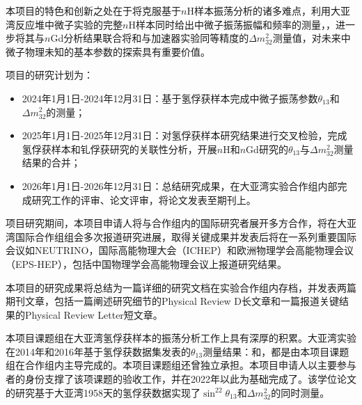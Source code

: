 \documentclass[a4paper,zihao=-4]{article}
\begin{document}

本项目的特色和创新之处在于将克服基于$n$H样本振荡分析的诸多难点，利用大亚湾反应堆中微子实验的完整$n$H样本同时给出中微子振荡振幅和频率的测量，，进一步将其与$n$Gd分析结果联合将和与加速器实验同等精度的$\Delta m_{32}^2$测量值，对未来中微子物理未知的基本参数的探索具有重要价值。


项目的研究计划为：
\begin{itemize}
	\item 2024年1月1日-2024年12月31日：基于氢俘获样本完成中微子振荡参数$\theta_{13}$和$\Delta m_{32}^2$的测量；
	\item 2025年1月1日-2025年12月31日：对氢俘获样本研究结果进行交叉检验，完成氢俘获样本和钆俘获研究的关联性分析，开展$n$H和$n$Gd研究的$\theta_{13}$与$\Delta m_{32}^2$测量结果的合并；
	\item 2026年1月1日-2026年12月31日：总结研究成果，在大亚湾实验合作组内部完成研究工作的评审、论文评审，将论文发表至期刊上。
\end{itemize}

项目研究期间，本项目申请人将与合作组内的国际研究者展开多方合作，将在大亚湾国际合作组组会多次报道研究进展，取得关键成果并发表后将在一系列重要国际会议如NEUTRINO，国际高能物理大会（ICHEP）和欧洲物理学会高能物理会议（EPS-HEP），包括中国物理学会高能物理会议上报道研究结果。

本项目的研究成果将总结为一篇详细的研究文档在实验合作组内存档，并发表两篇期刊文章，包括一篇阐述研究细节的Physical Review D长文章和一篇报道关键结果的Physical Review Letter短文章。



本项目课题组在大亚湾氢俘获样本的振荡分析工作上具有深厚的积累。大亚湾实验在2014年和2016年基于氢俘获数据集发表的$\theta_{13}$测量结果：和，都是由本项目课题组在合作组内主导完成的。本项目课题组还曾独立承担。本项目申请人以主要参与者的身份支撑了该项课题的验收工作，并在2022年以此为基础完成了。该学位论文的研究基于大亚湾1958天的氢俘获数据实现了$\sin^22\theta_{13}$和$\Delta m_{32}^2$的同时测量。 
\end{document}
